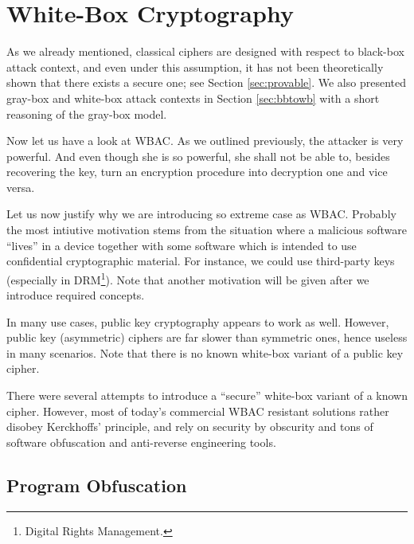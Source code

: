 \section{White-Box Cryptography}
\label{sec:wbc}

As we already mentioned, classical ciphers are designed with respect to black-box attack context, and even under this assumption, it has not been theoretically shown that there exists a secure one; see Section \ref{sec:provable}. We also presented gray-box and white-box attack contexts in Section \ref{sec:bbtowb} with a short reasoning of the gray-box model.

Now let us have a look at WBAC. As we outlined previously, the attacker is very powerful. And even though she is so powerful, she shall not be able to, besides recovering the key, turn an encryption procedure into decryption one and vice versa.

Let us now justify why we are introducing so extreme case as WBAC. Probably the most intiutive motivation stems from the situation where a malicious software ``lives'' in a device together with some software which is intended to use confidential cryptographic material. For instance, we could use third-party keys (especially in DRM\footnote{Digital Rights Management.}). Note that another motivation will be given after we introduce required concepts.

In many use cases, public key cryptography appears to work as well. However, public key (asymmetric) ciphers are far slower than symmetric ones, hence useless in many scenarios. Note that there is no known white-box variant of a public key cipher.

There were several attempts to introduce a ``secure'' white-box variant of a known cipher. However, most of today's commercial WBAC resistant solutions rather disobey Kerckhoffs' principle, and rely on security by obscurity and tons of software obfuscation and anti-reverse engineering tools.




\subsection{Program Obfuscation}
\label{sec:impos}

